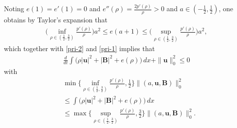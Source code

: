 \documentclass[12pt, reqno]{amsart}
\numberwithin{equation}{section}
\numberwithin{equation}{section}
\numberwithin{equation}{section}
\numberwithin{equation}{section}
\theoremstyle{remark}
\def\u{ \mathbf{u} }
\def\b{ \mathbf{B} }
\begin{document}
Noting $e(1)=e'(1)=0$ and $e''(\rho)=\frac{2p'(\rho)}{\rho}>0$ and $a\in(-\frac12,\frac12)$,
one obtains by  Taylor's expansion that
 \begin{equation*}\begin{split}
\Big(\inf_{\rho\in(\frac12,\frac32)}\frac{p'(\rho)}{\rho}\Big)a^2\leq e(a+1)\leq \Big(\sup_{\rho\in(\frac12,\frac32)}\frac{p'(\rho)}{\rho}\Big)a^2,
\end{split}\end{equation*}
which  together with \eqref{pri-2} and \eqref{pri-1} implies that
\begin{equation}\begin{split}\label{pri-1-1}
\frac{d}{dt}\int\Big(\rho|\u|^2+|\b|^2+e(\rho)\Big)\,dx+\|\u\|_0^2\leq0
\end{split}\end{equation}
with \begin{equation}\begin{split}\label{2026-6-27-pri-1-1}&\min\{\inf_{\rho\in(\frac12,\frac32)}\frac{p'(\rho)}{\rho},\frac12\}\|(a,\u,\b)\|^2_0\\&\leq\int\Big(\rho|\u|^2+|\b|^2+e(\rho)\Big)\,dx\\
&\leq\max\{\sup_{\rho\in(\frac12,\frac32)}\frac{p'(\rho)}{\rho},\frac32\}\|(a,\u,\b)\|^2_0.\end{split}\end{equation}
\end{document}
